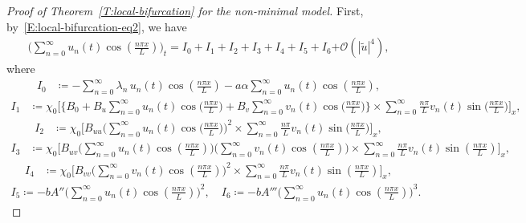 \documentclass[11pt]{article} %
\theoremstyle{remark}
\theoremstyle{remark}
\numberwithin{equation}{section}
\numberwithin{figure}{section}
\numberwithin{table}{section}
\begin{document}
\begin{proof}[Proof of Theorem~\ref{T:local-bifurcation}  for the non-minimal model]
  First, by~\eqref{E:local-bifurcation-eq2}, we have
  \begin{align}\label{E:u_n-eq}
    \Big(\sum_{n=0}^\infty u_n(t)\cos(\tfrac{n\pi x}{L})\Big)_t =I_0 + I_1 + I_2
    + I_3 + I_4 + I_5 + I_6
    { + \mathcal{O}(|\tilde{u}|^4)},
  \end{align}
  where
  \begin{align*}
    I_0
    &\coloneqq -\sum_{n=0}^\infty \lambda_n\,u_n(t)\cos(\tfrac{n\pi x}{L}) - {
    a\alpha  \sum_{n=0}^\infty u_n(t)\cos(\tfrac{n\pi x}{L}) },
  \end{align*}
  \begin{align*}
    I_1
    &\coloneqq \chi_0 \Big[ \Big\{B_0
    + B_u\sum_{n=0}^\infty u_n(t)\cos\big(\tfrac{n\pi x}{L}\big)
    + B_v\sum_{n=0}^\infty v_n(t)\cos\big(\tfrac{n\pi x}{L}\big)
    \Big\} \times
    \sum_{n=0}^\infty \tfrac{n\pi}{L} v_n(t)\sin\big(\tfrac{n\pi x}{L}\big)
    \Big]_x,
  \end{align*}
  \begin{align*}
    I_2
    &\coloneqq
    \chi_0
    \Big[
    B_{uu}\Big(\sum_{n=0}^\infty u_n(t)\cos\big(\tfrac{n\pi x}{L}\big)\Big)^2
    \times
    \sum_{n=0}^\infty \tfrac{n\pi}{L} v_n(t)\sin\big(\tfrac{n\pi x}{L}\big)
    \Big]_x,
  \end{align*}
  \begin{align*}
    I_3
    &\coloneqq
    \chi_0
    \Big[
    B_{uv}\big(\sum_{n=0}^\infty u_n(t)\cos(\tfrac{n\pi x}{L})\big)
    \big(\sum_{n=0}^\infty v_n(t)\cos(\tfrac{n\pi x}{L})\big)
    \times \sum_{n=0}^\infty \tfrac{n\pi}{L} v_n(t)\sin(\tfrac{n\pi x}{L})
    \Big]_x,
  \end{align*}
  \begin{align*}
    I_4
    &\coloneqq
    \chi_0
    \Big[
    B_{vv}\big(\sum_{n=0}^\infty v_n(t)\cos(\tfrac{n\pi x}{L})\big)^2
    \times
    \sum_{n=0}^\infty \tfrac{n\pi}{L} v_n(t)\sin(\tfrac{n\pi x}{L})
    \Big]_x,
  \end{align*}
  \begin{align*}
    I_5
    \coloneqq
    - bA''
    \Big(\sum_{n=0}^\infty u_n(t)\cos(\tfrac{n\pi x}{L})\Big)^2,
    \quad
    I_6\coloneqq
    - b A'''
    \Big(\sum_{n=0}^\infty u_n(t)\cos(\tfrac{n\pi x}{L})\Big)^3.
  \end{align*}


\end{proof}
\end{document}
